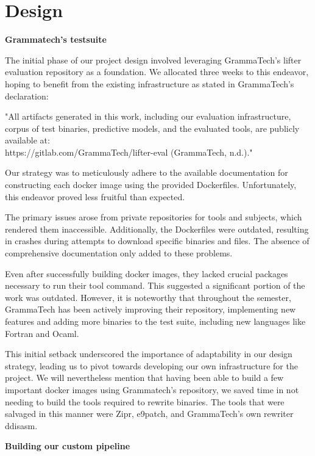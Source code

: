 \documentclass[a4paper,11pt,oneside]{report}
\begin{document}
\chapter{Design}

\setlength{\parindent}{4em}
\textbf{Grammatech’s testsuite}

The initial phase of our project design involved leveraging GrammaTech's lifter
evaluation repository as a foundation. We allocated three weeks to this endeavor, hoping to
benefit from the existing infrastructure as stated in GrammaTech's declaration:

"All artifacts generated in this work, including our evaluation infrastructure, corpus
of test binaries, predictive models, and the evaluated tools, are publicly available at:\\
https://gitlab.com/GrammaTech/lifter-eval (GrammaTech, n.d.)."

Our strategy was to meticulously adhere to the available documentation for
constructing each docker image using the provided Dockerfiles. Unfortunately, this
endeavor proved less fruitful than expected.

The primary issues arose from private repositories for tools and subjects, which
rendered them inaccessible. Additionally, the Dockerfiles were outdated, resulting in
crashes during attempts to download specific binaries and files. The absence of
comprehensive documentation only added to these problems.

Even after successfully building docker images, they lacked crucial packages
necessary to run their tool command. This suggested a significant portion of the work was
outdated. However, it is noteworthy that throughout the semester, GrammaTech has been
actively improving their repository, implementing new features and adding more binaries to
the test suite, including new languages like Fortran and Ocaml.

This initial setback underscored the importance of adaptability in our design
strategy, leading us to pivot towards developing our own infrastructure for the project. We
will nevertheless mention that having been able to build a few important docker images
using Grammatech’s repository, we saved time in not needing to build the tools required to
rewrite binaries. The tools that were salvaged in this manner were Zipr, e9patch, and
GrammaTech’s own rewriter ddisasm.

\textbf{Building our custom pipeline}
\end{document}
